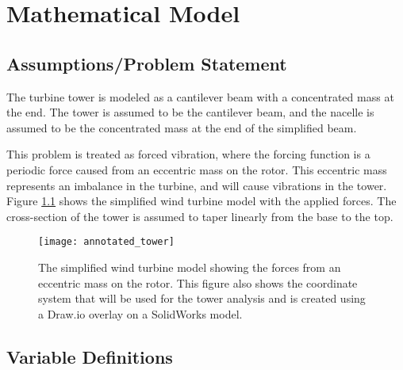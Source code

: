 \chapter{Mathematical Model} %

\label{ch_math_model}


\section{Assumptions/Problem Statement}

The turbine tower is modeled as a cantilever beam with a concentrated mass at the end.  The tower is assumed to be the cantilever beam, and the nacelle is assumed to be the concentrated mass at the end of the simplified beam.

This problem is treated as forced vibration, where the forcing function is a periodic force caused from an eccentric mass on the rotor.  This eccentric mass represents an imbalance in the turbine, and will cause vibrations in the tower.   Figure \ref{fig:annotated_tower} shows the simplified wind turbine model with the applied forces. The cross-section of the tower is assumed to taper linearly from the base to the top.

\begin{figure}
	\centering
	\texttt{[image: annotated\_tower]}
	\decoRule
	\caption{The simplified wind turbine model showing the forces from an eccentric mass on the rotor.  This figure also shows the coordinate system that will be used for the tower analysis and is created using a Draw.io overlay on a SolidWorks model.}
	\label{fig:annotated_tower}
\end{figure}


\section{Variable Definitions}


